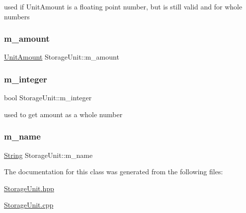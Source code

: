 used if Unit\+Amount is a floating point number, but is still valid and for whole numbers \mbox{\label{classStorageUnit_a7347d44416bdc5c46ad14cc6df8649e1}} 
\subsubsection{\texorpdfstring{m\+\_\+amount}{m\_amount}}
{\footnotesize\ttfamily \hyperlink{StorageUnit_8hpp_a13b2ba6b0400e1aa0b57282bd1228f20}{Unit\+Amount} Storage\+Unit\+::m\+\_\+amount\hspace{0.3cm}{\ttfamily [private]}}

\mbox{\label{classStorageUnit_a6079df4176f8367dc53a97f5445646a4}} 
\subsubsection{\texorpdfstring{m\+\_\+integer}{m\_integer}}
{\footnotesize\ttfamily bool Storage\+Unit\+::m\+\_\+integer\hspace{0.3cm}{\ttfamily [private]}}



used to get amount as a whole number 

\mbox{\label{classStorageUnit_a5cef8bd3450e37f27989a329fda7da83}} 
\subsubsection{\texorpdfstring{m\+\_\+name}{m\_name}}
{\footnotesize\ttfamily \hyperlink{classString}{String} Storage\+Unit\+::m\+\_\+name\hspace{0.3cm}{\ttfamily [private]}}



The documentation for this class was generated from the following files\+:\begin{DoxyCompactItemize}
\item 
\hyperlink{StorageUnit_8hpp}{Storage\+Unit.\+hpp}\item 
\hyperlink{StorageUnit_8cpp}{Storage\+Unit.\+cpp}\end{DoxyCompactItemize}
